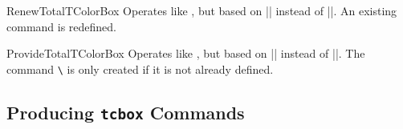 \begin{docCommand}{RenewTotalTColorBox}{}
  Operates like , but based on |\RenewDocumentCommand| instead of |\DeclareDocumentCommand|.
  An existing command is redefined.
\end{docCommand}

\begin{docCommand}{ProvideTotalTColorBox}{}
  Operates like , but based on |\ProvideDocumentCommand| instead of |\DeclareDocumentCommand|.
  The command \texttt{\textbackslash} is only created if it is not already defined.
\end{docCommand}



\clearpage
\subsection{Producing \texttt{tcbox} Commands}\label{subsec:macros_tcbox}

